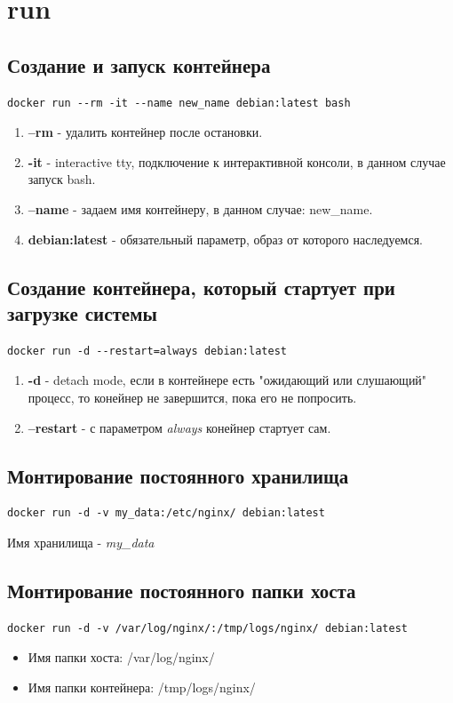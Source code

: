 \section{run}

\subsection{Создание и запуск контейнера}
\begin{lstlisting}
docker run --rm -it --name new_name debian:latest bash
\end{lstlisting}

\begin{enumerate}
\item \textbf{--rm} - удалить контейнер после остановки.
\item \textbf{-it} - interactive tty, подключение к интерактивной консоли, в данном случае запуск bash.
\item \textbf{--name} - задаем имя контейнеру, в данном случае: new\_name.
\item \textbf{debian:latest} - обязательный параметр, образ от которого наследуемся.
\end{enumerate}

\subsection{Создание контейнера, который стартует при загрузке системы}
\begin{lstlisting}
docker run -d --restart=always debian:latest
\end{lstlisting}
\begin{enumerate}
\item \textbf{-d} - detach mode, если в контейнере есть "ожидающий или слушающий" процесс, то конейнер не завершится, пока его не попросить.
\item \textbf{--restart} - с параметром \textit{always} конейнер стартует сам.
\end{enumerate}

\subsection{Монтирование постоянного хранилища}
\begin{lstlisting}
docker run -d -v my_data:/etc/nginx/ debian:latest
\end{lstlisting}
Имя хранилища - \textit{my\_data}

\subsection{Монтирование постоянного папки хоста}
\begin{lstlisting}
docker run -d -v /var/log/nginx/:/tmp/logs/nginx/ debian:latest
\end{lstlisting}
\begin{itemize}
\item Имя папки хоста: /var/log/nginx/
\item Имя папки контейнера: /tmp/logs/nginx/
\end{itemize}


